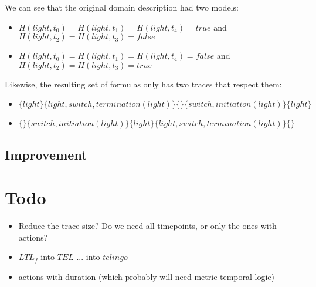 We can see that the original domain description had two models:
\begin{itemize}
  \item $H(light,t_0)=H(light,t_1)=H(light,t_4)=true$ and $H(light,t_2)=H(light,t_3)=false$
  \item $H(light,t_0)=H(light,t_1)=H(light,t_4)=false$ and $H(light,t_2)=H(light,t_3)=true$
\end{itemize}

Likewise, the resulting set of formulas only has two traces that respect them:
\begin{itemize}
  \item $\{light\}\{light,switch,termination(light)\}\{\}\{switch,initiation(light)\}\{light\}$
  \item $\{\}\{switch,initiation(light)\}\{light\}\{light,switch,termination(light)\}\{\}$
\end{itemize}

\subsection{Improvement}




\section{Todo}

\begin{itemize}
  \item Reduce the trace size? Do we need all timepoints, or only the ones with actions?
  \item $LTL_f$ into $TEL$ ... into $telingo$
  \item actions with duration (which probably will need metric temporal logic)
\end{itemize}
